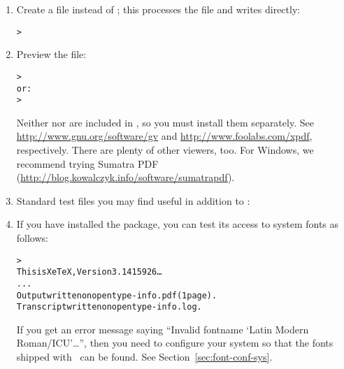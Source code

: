 \documentclass{article}
\begin{document}
\begin{enumerate}
\item Create a  file instead of \dvi{}; this processes the
 file and writes  directly:
\begin{alltt}
> 
\end{alltt}

\item Preview the  file:
\begin{alltt}
> 
\textrm{or:}
> 
\end{alltt}
Neither  nor  are included in \TL{}, so you
must install them separately.  See \url{http://www.gnu.org/software/gv}
and \url{http://www.foolabs.com/xpdf}, respectively.  There are plenty
of other  viewers, too.  For Windows, we recommend trying
Sumatra PDF (\url{http://blog.kowalczyk.info/software/sumatrapdf}).

\item Standard test files you may find useful in addition to
:


\item If you have installed the  package, you can test
its access to system fonts as follows:
\begin{alltt}
> 
This is XeTeX, Version 3.1415926\dots
...
Output written on opentype-info.pdf (1 page).
Transcript written on opentype-info.log.
\end{alltt}

If you get an error message saying ``Invalid fontname `Latin Modern
Roman/ICU'\dots'', then you need to configure your system so that the
fonts shipped with \TL\ can be found.  See
Section~\ref{sec:font-conf-sys}.

\end{enumerate}
\end{document}
